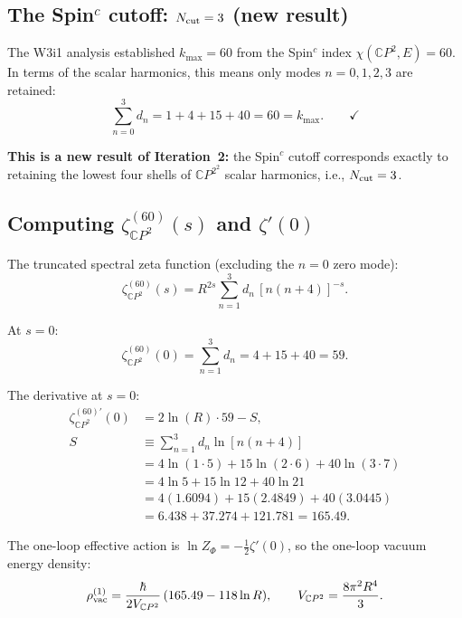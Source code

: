 \documentclass[11pt]{article}
\newcommand{\CP}{\mathbb{C}P^2}
\begin{document}
\subsection{The Spin$^c$ cutoff: $N_{\rm cut} = 3$ (new result)}

The W3i1 analysis established $k_{\max} = 60$ from the Spin$^c$ index
$\chi(\CP, E) = 60$.  In terms of the scalar harmonics, this means
only modes $n = 0, 1, 2, 3$ are retained:
\begin{equation}
  \sum_{n=0}^{3} d_n = 1 + 4 + 15 + 40 = 60 = k_{\max}. \qquad \checkmark
\end{equation}

\textbf{This is a new result of Iteration~2:} the Spin$^c$ cutoff
corresponds exactly to retaining the lowest four shells of $\CP^2$
scalar harmonics, i.e., $N_{\rm cut} = 3$.

\subsection{Computing $\zeta_{\CP}^{(60)}(s)$ and $\zeta'(0)$}

The truncated spectral zeta function (excluding the $n=0$ zero mode):
\begin{equation}
  \zeta_{\CP}^{(60)}(s)
  = R^{2s} \sum_{n=1}^{3} d_n\,[n(n+4)]^{-s}.
\end{equation}

At $s = 0$:
\begin{equation}
  \zeta_{\CP}^{(60)}(0) = \sum_{n=1}^{3} d_n = 4 + 15 + 40 = 59.
\end{equation}

The derivative at $s = 0$:
\begin{align}
  \zeta_{\CP}^{(60)\prime}(0)
  &= 2\ln(R)\cdot 59 - S, \\
  S &\equiv \sum_{n=1}^{3} d_n\ln[n(n+4)] \nonumber\\
  &= 4\ln(1\cdot 5) + 15\ln(2\cdot 6) + 40\ln(3\cdot 7) \nonumber\\
  &= 4\ln 5 + 15\ln 12 + 40\ln 21 \nonumber\\
  &= 4(1.6094) + 15(2.4849) + 40(3.0445) \nonumber\\
  &= 6.438 + 37.274 + 121.781 = 165.49.
\end{align}

The one-loop effective action is $\ln Z_\Phi = -\tfrac{1}{2}\zeta'(0)$,
so the one-loop vacuum energy density:
\begin{equation}\label{eq:vac-energy}
  \rho_{\rm vac}^{(1)} = \frac{\hbar}{2V_{\CP}}\,(165.49 - 118\ln R),
  \qquad V_{\CP} = \frac{8\pi^2 R^4}{3}.
\end{equation}
\end{document}
